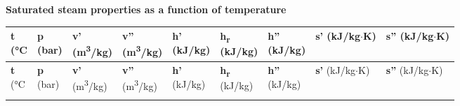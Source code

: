 \begin{center}
    \textbf{ Saturated steam properties as a function of temperature }
\end{center}
\vspace{0.2cm} %

\begin{longtable}{|>{\raggedleft\arraybackslash}p{1.2cm}|>{\raggedleft\arraybackslash}p{1.8cm}|>{\raggedleft\arraybackslash}p{1.8cm}|>{\raggedleft\arraybackslash}p{1.8cm}|>{\raggedleft\arraybackslash}p{1.5cm}|
>{\raggedleft\arraybackslash}p{1.5cm}|>{\raggedleft\arraybackslash}p{1.5cm}|>{\raggedleft\arraybackslash}p{1.5cm}|>{\raggedleft\arraybackslash}p{1.5cm}|}
\hline
\small \makecell{\textbf{t} \\ (°C} & \small \makecell{\textbf{p} \\ (bar)} 
& \small \makecell{\textbf{v'} \\ (m\textsuperscript{3}/kg)} & \small \makecell{\textbf{v''} \\ (m\textsuperscript{3}/kg)} 
& \small \makecell{\textbf{h'} \\ (kJ/kg)} & \small \makecell{\textbf{h\textsubscript{r}} \\ (kJ/kg)} & \small \makecell{\textbf{h''} \\ (kJ/kg)} 
& \small \makecell{\textbf{s'} \\ (kJ/kg$\cdot$K)} & \small \makecell{\textbf{s''} \\ (kJ/kg$\cdot$K)} \\
\hline
\endfirsthead

\hline
\small \makecell{\textbf{t} \\ (°C} & \small \makecell{\textbf{p} \\ (bar)} 
& \small \makecell{\textbf{v'} \\ (m\textsuperscript{3}/kg)} & \small \makecell{\textbf{v''} \\ (m\textsuperscript{3}/kg)} 
& \small \makecell{\textbf{h'} \\ (kJ/kg)} & \small \makecell{\textbf{h\textsubscript{r}} \\ (kJ/kg)} & \small \makecell{\textbf{h''} \\ (kJ/kg)} 
& \small \makecell{\textbf{s'} \\ (kJ/kg$\cdot$K)} & \small \makecell{\textbf{s''} \\ (kJ/kg$\cdot$K)} \\
\hline
\endhead

\hline
\endfoot


\end{longtable}
